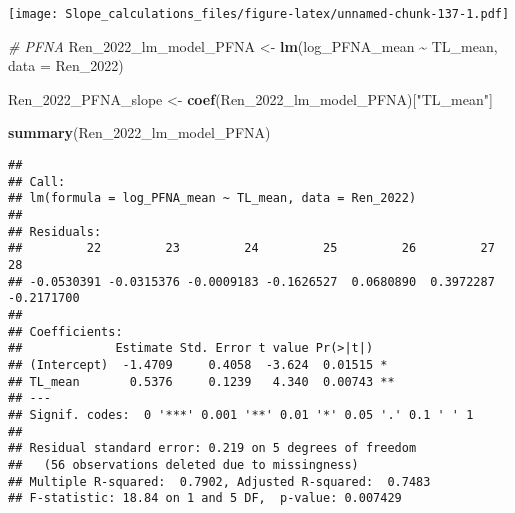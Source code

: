 \documentclass[
]{article}
\newenvironment{Shaded}{\begin{snugshade}}{\end{snugshade}}
\newcommand{\AttributeTok}[1]{\textcolor[rgb]{0.13,0.29,0.53}{#1}}
\newcommand{\CommentTok}[1]{\textcolor[rgb]{0.56,0.35,0.01}{\textit{#1}}}
\newcommand{\FunctionTok}[1]{\textcolor[rgb]{0.13,0.29,0.53}{\textbf{#1}}}
\newcommand{\NormalTok}[1]{#1}
\newcommand{\OtherTok}[1]{\textcolor[rgb]{0.56,0.35,0.01}{#1}}
\newcommand{\SpecialCharTok}[1]{\textcolor[rgb]{0.81,0.36,0.00}{\textbf{#1}}}
\newcommand{\StringTok}[1]{\textcolor[rgb]{0.31,0.60,0.02}{#1}}
\begin{document}
\texttt{[image: Slope\_calculations\_files/figure-latex/unnamed-chunk-137-1.pdf]}

\begin{Shaded}
\begin{Highlighting}[]
\CommentTok{\# PFNA}
\NormalTok{Ren\_2022\_lm\_model\_PFNA }\OtherTok{\textless{}{-}} \FunctionTok{lm}\NormalTok{(log\_PFNA\_mean }\SpecialCharTok{\textasciitilde{}}\NormalTok{ TL\_mean,}
                              \AttributeTok{data =}\NormalTok{ Ren\_2022)}

\NormalTok{Ren\_2022\_PFNA\_slope }\OtherTok{\textless{}{-}} \FunctionTok{coef}\NormalTok{(Ren\_2022\_lm\_model\_PFNA)[}\StringTok{"TL\_mean"}\NormalTok{]}

\FunctionTok{summary}\NormalTok{(Ren\_2022\_lm\_model\_PFNA)}
\end{Highlighting}
\end{Shaded}

\begin{verbatim}
## 
## Call:
## lm(formula = log_PFNA_mean ~ TL_mean, data = Ren_2022)
## 
## Residuals:
##         22         23         24         25         26         27         28 
## -0.0530391 -0.0315376 -0.0009183 -0.1626527  0.0680890  0.3972287 -0.2171700 
## 
## Coefficients:
##             Estimate Std. Error t value Pr(>|t|)   
## (Intercept)  -1.4709     0.4058  -3.624  0.01515 * 
## TL_mean       0.5376     0.1239   4.340  0.00743 **
## ---
## Signif. codes:  0 '***' 0.001 '**' 0.01 '*' 0.05 '.' 0.1 ' ' 1
## 
## Residual standard error: 0.219 on 5 degrees of freedom
##   (56 observations deleted due to missingness)
## Multiple R-squared:  0.7902, Adjusted R-squared:  0.7483 
## F-statistic: 18.84 on 1 and 5 DF,  p-value: 0.007429
\end{verbatim}
\end{document}
